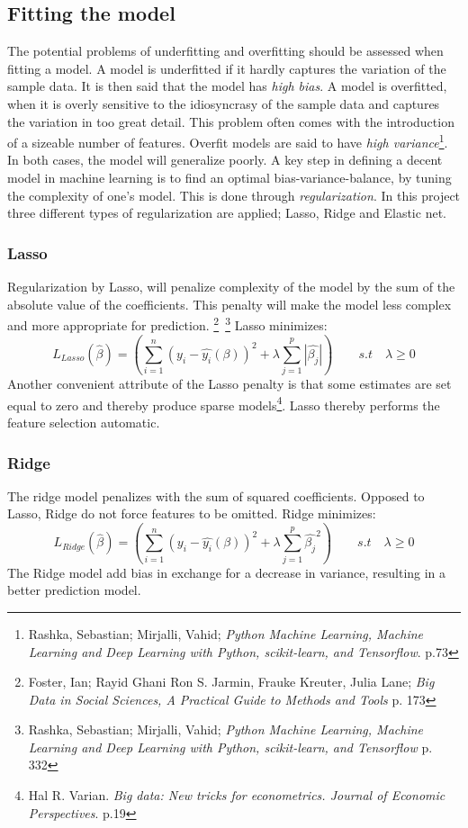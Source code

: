 \documentclass[12pt,a4paper]{article}
\begin{document}
\subsection{Fitting the model}
The potential problems of underfitting and overfitting should be assessed when fitting a model. A model is underfitted if it hardly captures the variation of the sample data. It is then said that the model has \textit{high bias}. A model is overfitted, when it is overly sensitive to the idiosyncrasy of the sample data and captures the variation in too great detail. This problem often comes with the introduction of a sizeable number of features. Overfit models are said to have \textit{high variance}\footnote{Rashka, Sebastian; Mirjalli, Vahid; \textit{Python Machine Learning, Machine Learning and Deep Learning with Python, scikit-learn, and Tensorflow}. p.73}. In both cases, the model will generalize poorly. A key step in defining a decent model in machine learning is to find an optimal bias-variance-balance, by tuning the complexity of one’s model. This is done through \textit{regularization}. In this project three different types of regularization are applied; Lasso, Ridge and Elastic net.   

\subsubsection{Lasso}
Regularization by Lasso, will penalize complexity of the model by the sum of the absolute value of the coefficients. This penalty will make the model less complex and more appropriate for prediction.  \footnote{Foster, Ian; Rayid Ghani Ron S. Jarmin, Frauke Kreuter, Julia Lane; \textit{Big Data in Social Sciences, A Practical Guide to Methods and Tools} p. 173}\, \footnote{Rashka, Sebastian; Mirjalli, Vahid; \textit{Python Machine Learning, Machine Learning and Deep Learning with Python, scikit-learn, and Tensorflow} p. 332}
\newline Lasso minimizes: $$L_{Lasso}(\hat{\beta}) = \left(\sum_{i=1}^{n} (y_i-\hat{y_i}(\beta))^2+\lambda\sum_{j=1}^{p}|\hat{\beta_j}|\right) \qquad s.t \quad \lambda \geq 0 $$
Another convenient attribute of the Lasso penalty is that some estimates are set equal to zero and thereby produce sparse models\footnote{Hal R. Varian. \textit{Big data: New tricks for econometrics. Journal of Economic Perspectives}. p.19}. Lasso thereby performs the feature selection automatic.   
\subsubsection{Ridge}
The ridge model penalizes with the sum of squared coefficients. Opposed to Lasso, Ridge do not force features to be omitted. Ridge minimizes:
$$L_{Ridge}(\hat{\beta}) = \left(\sum_{i=1}^{n} (y_i-\hat{y_i}(\beta))^2+\lambda\sum_{j=1}^{p}\hat{\beta_j}^2\right) \qquad s.t \quad \lambda \geq 0 $$ 
The Ridge model add bias in exchange for a decrease in variance, resulting in a better prediction model. 
\end{document}
